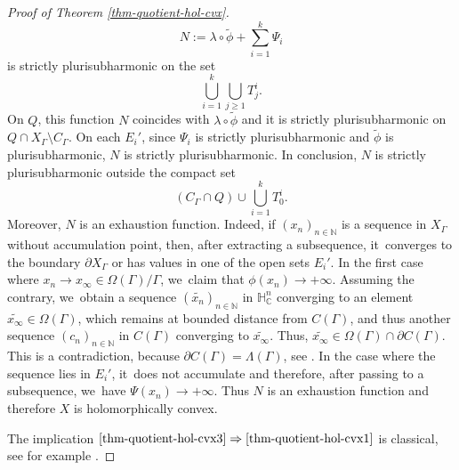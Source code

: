 \documentclass[11pt]{article}
\theoremstyle{definition}
\newcommand{\C}{\mathbb{C}}
\newcommand{\N}{\mathbb{N}}
\newcommand{\HNC}{\mathbb{H}^{n}_{\C}}
\def\C{\mathbb{C}}
\newcommand{\HNC}{\mathbb{H}^{n}_{\C}}
\begin{document}
\begin{proof}[Proof of Theorem \ref{thm-quotient-hol-cvx}]
\begin{equation*}
N:= \lambda\circ\widetilde{\phi} + \sum_{i=1}^{k}\Psi_i
\end{equation*}
is strictly plurisubharmonic on the set
\begin{equation*}
\bigcup_{i=1}^{k}\bigcup_{j\ge1}T^{i}_{j}.
\end{equation*}
On $Q$, this function $N$ coincides with $\lambda\circ\widetilde{\phi}$ and it is strictly plurisubharmonic on \hbox{$Q\cap X_{\Gamma}\setminus C_{\Gamma}$}. On each $E_i'$, since $\Psi_i$ is strictly plurisubharmonic and $\widetilde{\phi}$ is plurisubharmonic, $N$ is strictly plurisubharmonic. In conclusion, $N$ is strictly plurisubharmonic outside the compact set
\begin{equation*}
(C_{\Gamma}\cap Q)\cup\bigcup_{i=1}^{k}T^{i}_{0}.
\end{equation*}
Moreover, $N$ is an exhaustion function. Indeed, if $(x_n)_{n\in \N}$ is a sequence in $X_{\Gamma}$ without accumulation point, then, after extracting a subsequence, it~converges to the boundary $\partial X_{\Gamma}$ or has values in one of the open sets $E_i'$. In the first case where $x_n \to x_{\infty}\in \Omega(\Gamma)/\Gamma$, we~claim that $\phi(x_n)\to +\infty$. Assuming the contrary, we~obtain a sequence $(\widetilde{x_n})_{n\in \N}$ in $\HNC$ converging to an element $\widetilde{x_{\infty}}\in \Omega(\Gamma)$, which remains at bounded distance from $C(\Gamma)$, and thus another sequence $(c_n)_{n\in \N}$ in $C(\Gamma)$ converging to $\widetilde{x_{\infty}}$. Thus, $\widetilde{x_{\infty}}\in \Omega(\Gamma) \cap \partial C(\Gamma)$. This is a contradiction, because $\partial C(\Gamma)=\Lambda(\Gamma)$, see \cite{andersonDirichletProblemInfinity1983}. In the case where the sequence lies in $E_i'$, it~does not accumulate and therefore, after passing to a subsequence, we~have $\Psi(x_n)\to +\infty$. Thus $N$ is an exhaustion function and therefore $X$ is holomorphically convex.

The implication $\eqref{thm-quotient-hol-cvx3}\Rightarrow\eqref{thm-quotient-hol-cvx1}$ is classical, see for example \cite[Th.\,I.6.14]{demaillyComplexAnalyticDifferential-manuel}.
\end{proof}
\end{document}
